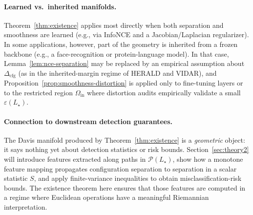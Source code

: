 \documentclass[11pt]{article}
\begin{document}
\paragraph{Learned vs.\ inherited manifolds.}
Theorem~\ref{thm:existence} applies most directly when both separation and smoothness are
learned (e.g., via InfoNCE and a Jacobian/Laplacian regularizer). In some applications, however,
part of the geometry is inherited from a frozen backbone (e.g., a face-recognition or protein-language
model). In that case, Lemma~\ref{lem:nce-separation} may be replaced by an empirical assumption
about $\Delta_{\mathrm{cfg}}$ (as in the inherited-margin regime of HERALD and VIDAR), and
Proposition~\ref{prop:smoothness-distortion} is applied only to fine-tuning layers or to the
restricted region $\Omega_{\mathrm{in}}$ where distortion audits empirically validate a small
$\varepsilon(L_\star)$.

\paragraph{Connection to downstream detection guarantees.}
The Davis manifold produced by Theorem~\ref{thm:existence} is a \emph{geometric} object: it says
nothing yet about detection statistics or risk bounds. Section~\ref{sec:theory2} will introduce
features extracted along paths in $\mathcal{P}(L_\star)$, show how a monotone feature mapping
propagates configuration separation to separation in a scalar statistic $S$, and apply finite-variance
inequalities to obtain misclassification-risk bounds. The existence theorem here ensures that those
features are computed in a regime where Euclidean operations have a meaningful Riemannian
interpretation.
\end{document}
